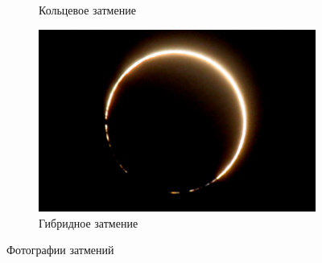 \documentclass{article}
\begin{document}
\begin{figure}[p]
\begin{subfigure}{0.3\textwidth}
			\caption{Кольцевое затмение}
		\end{subfigure}\hspace{0.2\textwidth}
		\begin{subfigure}{0.3\textwidth}
			\centering
			\includegraphics[scale = 0.4]{img/hybrid}
			\caption{Гибридное затмение}
		\end{subfigure}
		\caption{Фотографии затмений}
	\end{figure}
\end{document}
